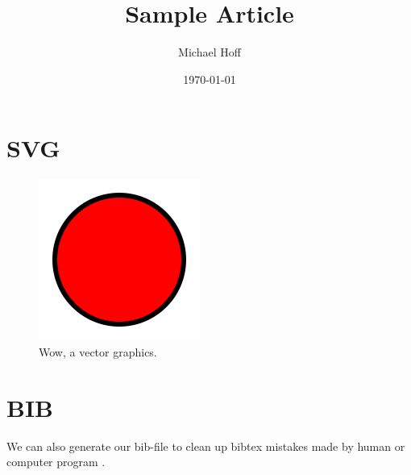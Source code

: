 \documentclass[a4paper]{article}
\title{Sample Article}
\author{Michael Hoff}
\date{\today}
\begin{document}
\maketitle

\section{SVG}

\lipsum[1]

\begin{figure}[h!]
    \begin{center}
        \includegraphics{fig/svg/circle}
        \caption{Wow, a vector graphics.}
    \end{center}
\end{figure}

\section{BIB}

We can also generate our bib-file to clean up
bibtex mistakes made by human or computer program
\cite{Lee2016}.


\end{document}
